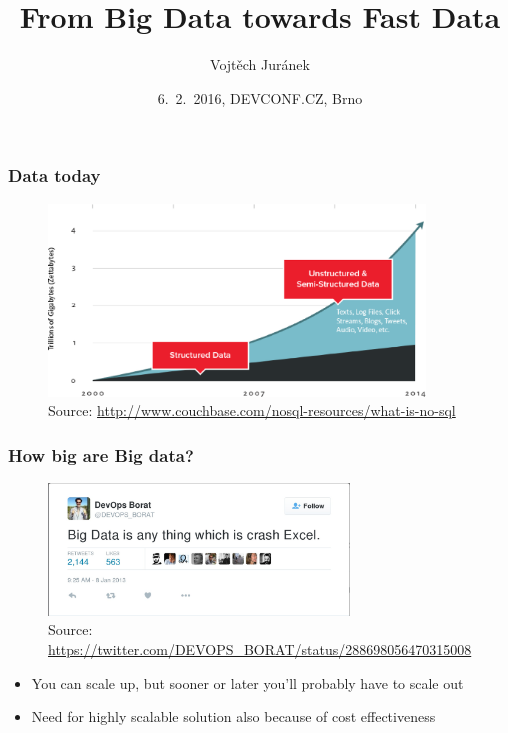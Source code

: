 \documentclass[10pt,utf8]{beamer}
\title{From Big Data towards Fast Data}
\author{Vojtěch Juránek}
\institute[Red Hat]{JBoss - a division by Red Hat}
\date{6.~2.~2016, DEVCONF.CZ, Brno}
\begin{document}
	
\begin{frame}
 \titlepage
\end{frame}
	
\begin{frame}
	\frametitle{Data today}
	\begin{figure}
		\centering
		\includegraphics[width=10cm]{./img/why-nosql-2.eps}
		\caption{\tiny{Source: \url{http://www.couchbase.com/nosql-resources/what-is-no-sql}}}
	\end{figure}
\end{frame}

\begin{frame}
	\frametitle{How big are Big data?}
	 {
		\begin{figure}
			\centering
			\includegraphics[width=8cm]{./img/borat_big_data.eps}
			\caption{\tiny{Source: \url{https://twitter.com/DEVOPS\_BORAT/status/288698056470315008}}}
		\end{figure}
	}
	 {
		\begin{itemize}
			\item You can scale up, but sooner or later you'll probably have to scale out
			\item Need for highly scalable solution also because of cost effectiveness
		\end{itemize}
	}
\end{frame}
\end{document}
